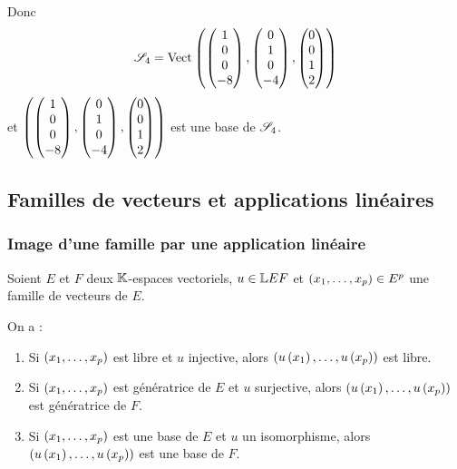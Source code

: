 \begin{corr}[4]
Donc \[\fami{S}_4=\Vect{\begin{pmatrix}1\\0\\0\\-8\end{pmatrix},\begin{pmatrix}0\\1\\0\\-4\end{pmatrix},\begin{pmatrix}0\\0\\1\\2\end{pmatrix}}\] et \(\left(\begin{pmatrix}1\\0\\0\\-8\end{pmatrix},\begin{pmatrix}0\\1\\0\\-4\end{pmatrix},\begin{pmatrix}0\\0\\1\\2\end{pmatrix}\right)\) est une base de \(\mathscr{S}_4\).
\end{corr}

\subsection{Familles de vecteurs et applications linéaires}

\subsubsection{Image d'une famille par une application linéaire}

\begin{prop}
Soient \(E\) et \(F\) deux \(\mathbb{K}\)-espaces vectoriels, \(u\in\mathbb{L}{E}{F}\) et \(\left(x_1,\dots,x_p\right)\in E^p\) une famille de vecteurs de \(E\).

On a :

\begin{enumerate}
\item Si \(\left(x_1,\dots,x_p\right)\) est libre et \(u\) injective, alors \(\left(u\left(x_1\right),\dots,u\left(x_p\right)\right)\) est libre. \\

\item Si \(\left(x_1,\dots,x_p\right)\) est génératrice de \(E\) et \(u\) surjective, alors \(\left(u\left(x_1\right),\dots,u\left(x_p\right)\right)\) est génératrice de \(F\). \\

\item Si \(\left(x_1,\dots,x_p\right)\) est une base de \(E\) et \(u\) un isomorphisme, alors \(\left(u\left(x_1\right),\dots,u\left(x_p\right)\right)\) est une base de \(F\).
\end{enumerate}
\end{prop}

